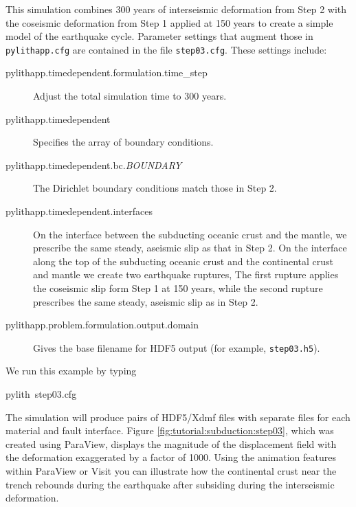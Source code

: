 This simulation combines 300 years of interseismic deformation from
Step 2 with the coseismic deformation from Step 1 applied at 150 years
to create a simple model of the earthquake cycle. Parameter settings
that augment those in \texttt{pylithapp.cfg} are contained in the
file \texttt{step03.cfg}. These settings include:
\begin{description}
\item [{pylithapp.timedependent.formulation.time\_step}] Adjust the total
simulation time to 300 years.
\item [{pylithapp.timedependent}] Specifies the array of boundary conditions.
\item [{pylithapp.timedependent.bc.\textit{BOUNDARY}}] The Dirichlet boundary
conditions match those in Step 2.
\item [{pylithapp.timedependent.interfaces}] On the interface between the
subducting oceanic crust and the mantle, we prescribe the same steady,
aseismic slip as that in Step 2. On the interface along the top of
the subducting oceanic crust and the continental crust and mantle
we create two earthquake ruptures, The first rupture applies the coseismic
slip form Step 1 at 150 years, while the second rupture prescribes
the same steady, aseismic slip as in Step 2.
\item [{pylithapp.problem.formulation.output.domain}] Gives the base filename
for HDF5 output (for example, \texttt{step03.h5}).
\end{description}
We run this example by typing
\begin{lyxcode}
pylith~step03.cfg
\end{lyxcode}
The simulation will produce pairs of HDF5/Xdmf files with separate
files for each material and fault interface. Figure \vref{fig:tutorial:subduction:step03},
which was created using ParaView, displays the magnitude of the displacement
field with the deformation exaggerated by a factor of 1000. Using
the animation features within ParaView or Visit you can illustrate
how the continental crust near the trench rebounds during the earthquake
after subsiding during the interseismic deformation. 

